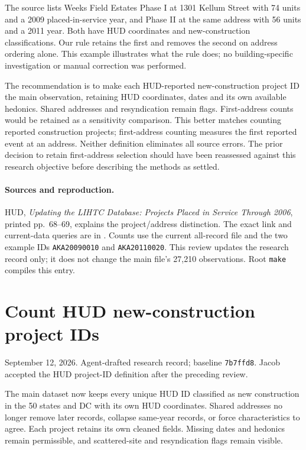 \documentclass[11pt]{article}
\begin{document}
The source lists Weeks Field Estates Phase I at 1301 Kellum Street with 74 units
and a 2009 placed-in-service year, and Phase II at the same address with 56 units
and a 2011 year. Both have HUD coordinates and new-construction classifications.
Our rule retains the first and removes the second on address ordering alone.
This example illustrates what the rule does; no building-specific investigation
or manual correction was performed.

The recommendation is to make each HUD-reported new-construction project ID the
main observation, retaining HUD coordinates, dates and its own available hedonics.
Shared addresses and resyndication remain flags. First-address counts would be
retained as a sensitivity comparison. This better matches counting reported
construction projects; first-address counting measures the first reported event
at an address. Neither definition eliminates all source errors. The prior decision
to retain first-address selection should have been reassessed against this
research objective before describing the methods as settled.

\paragraph{Sources and reproduction.} HUD, \emph{Updating the LIHTC Database:
Projects Placed in Service Through 2006}, printed pp.~68--69, explains the
project/address distinction. The exact link and current-data queries are in
.
Counts use the current all-record file and the two example IDs
\texttt{AKA20090010} and \texttt{AKA20110020}. This review updates the research
record only; it does not change the main file's 27,210 observations. Root
\texttt{make} compiles this entry.
\clearpage
\section*{Count HUD new-construction project IDs}
\noindent September 12, 2026. Agent-drafted research record; baseline
\texttt{7b7ffd8}. Jacob accepted the HUD project-ID definition after the preceding review.

The main dataset now keeps every unique HUD ID classified as new construction
in the 50 states and DC with its own HUD coordinates. Shared addresses no longer
remove later records, collapse same-year records, or force characteristics to
agree. Each project retains its own cleaned fields. Missing dates and hedonics
remain permissible, and scattered-site and resyndication flags remain visible.
\end{document}
